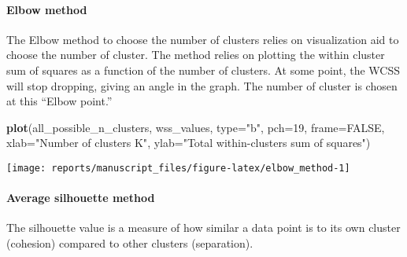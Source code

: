 \documentclass[9pt,a4paper,]{extarticle}
\newenvironment{Shaded}{\begin{snugshade}}{\end{snugshade}}
\newcommand{\DataTypeTok}[1]{\textcolor[rgb]{0.13,0.29,0.53}{#1}}
\newcommand{\DecValTok}[1]{\textcolor[rgb]{0.00,0.00,0.81}{#1}}
\newcommand{\KeywordTok}[1]{\textcolor[rgb]{0.13,0.29,0.53}{\textbf{#1}}}
\newcommand{\NormalTok}[1]{#1}
\newcommand{\OtherTok}[1]{\textcolor[rgb]{0.56,0.35,0.01}{#1}}
\newcommand{\StringTok}[1]{\textcolor[rgb]{0.31,0.60,0.02}{#1}}
\begin{document}
\hypertarget{elbow-method}{%
\paragraph{Elbow method}\label{elbow-method}}

The Elbow method to choose the number of clusters relies on visualization aid
to choose the number of cluster. The method relies on plotting the within
cluster sum of squares as a function of the number of clusters. At some point,
the WCSS will stop dropping, giving an angle in the graph. The number of
cluster is chosen at this ``Elbow point.''

\begin{Shaded}
\begin{Highlighting}[]
\KeywordTok{plot}\NormalTok{(all_possible_n_clusters, wss_values,}
     \DataTypeTok{type=}\StringTok{"b"}\NormalTok{, }\DataTypeTok{pch=}\DecValTok{19}\NormalTok{, }\DataTypeTok{frame=}\OtherTok{FALSE}\NormalTok{, }
     \DataTypeTok{xlab=}\StringTok{"Number of clusters K"}\NormalTok{,}
     \DataTypeTok{ylab=}\StringTok{"Total within-clusters sum of squares"}\NormalTok{)}
\end{Highlighting}
\end{Shaded}

\begin{center}\texttt{[image: reports/manuscript\_files/figure-latex/elbow\_method-1]} \end{center}

\hypertarget{average-silhouette-method}{%
\paragraph{Average silhouette method}\label{average-silhouette-method}}

The silhouette value is a measure of how similar a data point is to its own
cluster (cohesion) compared to other clusters (separation).
\end{document}
